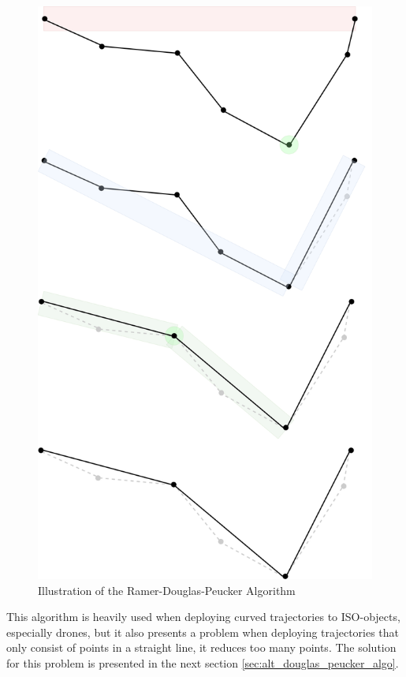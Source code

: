 \begin{figure}[H]
    \centering
    \includegraphics[scale=0.1]{figure/douglas_peucker_illustration.png}
    \caption{Illustration of the Ramer-Douglas-Peucker Algorithm}
    \label{fig:douglas_peucker}
\end{figure}
This algorithm is heavily used when deploying curved trajectories to ISO-objects, especially drones, but it also presents a problem when deploying trajectories that only consist of points in a straight line, it reduces too many points. The solution for this problem is presented in the next section \ref{sec:alt_douglas_peucker_algo}. 

